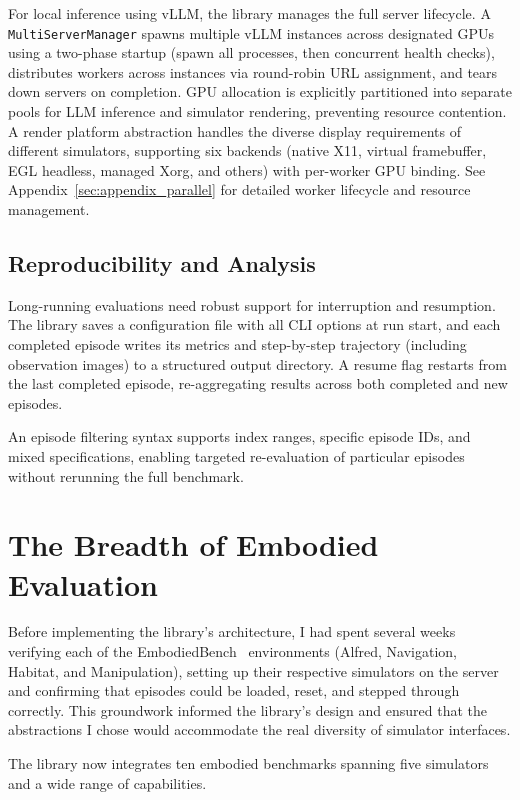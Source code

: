 For local inference using vLLM, the library manages the full server lifecycle. A \texttt{MultiServerManager} spawns multiple vLLM instances across designated GPUs using a two-phase startup (spawn all processes, then concurrent health checks), distributes workers across instances via round-robin URL assignment, and tears down servers on completion. GPU allocation is explicitly partitioned into separate pools for LLM inference and simulator rendering, preventing resource contention. A render platform abstraction handles the diverse display requirements of different simulators, supporting six backends (native X11, virtual framebuffer, EGL headless, managed Xorg, and others) with per-worker GPU binding. See Appendix~\ref{sec:appendix_parallel} for detailed worker lifecycle and resource management.

\subsection{Reproducibility and Analysis}

Long-running evaluations need robust support for interruption and resumption. The library saves a configuration file with all CLI options at run start, and each completed episode writes its metrics and step-by-step trajectory (including observation images) to a structured output directory. A resume flag restarts from the last completed episode, re-aggregating results across both completed and new episodes.

An episode filtering syntax supports index ranges, specific episode IDs, and mixed specifications, enabling targeted re-evaluation of particular episodes without rerunning the full benchmark.

\section{The Breadth of Embodied Evaluation}

Before implementing the library's architecture, I had spent several weeks verifying each of the EmbodiedBench~\cite{yang2025embodiedbenchcomprehensivebenchmarkingmultimodal} environments (Alfred, Navigation, Habitat, and Manipulation), setting up their respective simulators on the server and confirming that episodes could be loaded, reset, and stepped through correctly. This groundwork informed the library's design and ensured that the abstractions I chose would accommodate the real diversity of simulator interfaces.

The library now integrates ten embodied benchmarks spanning five simulators and a wide range of capabilities.


